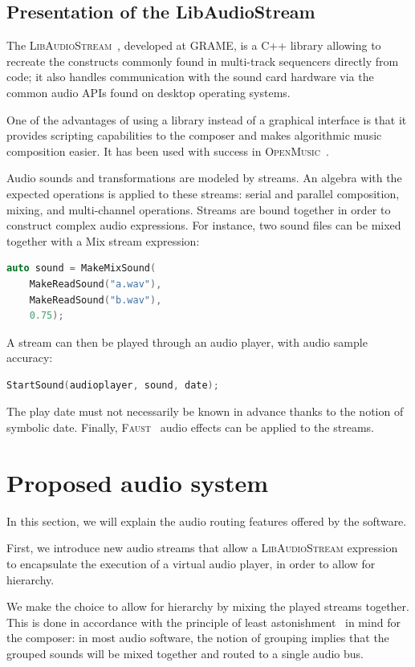 \documentclass{article}
\newcommand*{\LibAudioStream}{\textsc{LibAudioStream}\xspace}
\newcommand*{\openmusic}{\textsc{OpenMusic}\xspace}
\newcommand*{\faust}{\textsc{Faust}\xspace}
\begin{document}
\subsection{Presentation of the LibAudioStream}
The \LibAudioStream~\cite{letzlibaudiostream}, developed at GRAME, is a C++ library allowing to recreate the constructs commonly found in multi-track sequencers directly from code; it also handles communication with the sound card hardware via the common audio APIs found on desktop operating systems.

One of the advantages of using a library instead of a graphical interface is that it provides scripting capabilities to the composer and makes algorithmic music composition easier.
It has been used with success in \openmusic~\cite{bouche2014programmation}.

Audio sounds and transformations are modeled by streams. 
An algebra with the expected operations is applied to these streams: serial and parallel composition, mixing, and multi-channel operations.
Streams are bound together in order to construct complex audio expressions.
For instance, two sound files can be mixed together with a Mix stream expression: 
\begin{lstlisting}[language=C++,columns=fullflexible,basicstyle=\ttfamily]
auto sound = MakeMixSound(
    MakeReadSound("a.wav"), 
    MakeReadSound("b.wav"), 
    0.75);
\end{lstlisting}
A stream can then be played through an audio player, with audio sample accuracy:
 
\begin{lstlisting}[language=C++,columns=fullflexible,basicstyle=\ttfamily]
StartSound(audioplayer, sound, date);
\end{lstlisting}

The play date must not necessarily be known in advance thanks to the notion of symbolic date.
Finally, \faust~\cite{orlarey2009faust} audio effects can be applied to the streams.

\section{Proposed audio system}
In this section, we will explain the audio routing 
features offered by the software.

First, we introduce new audio streams that allow a \LibAudioStream
expression to encapsulate the execution of a virtual audio player, 
in order to allow for hierarchy.

We make the choice to allow for hierarchy by mixing the played streams together.
This is done in accordance with the principle of least astonishment~\cite{seebach2001cranky} in mind for the composer: 
in most audio software, the notion of grouping implies that the grouped sounds will be mixed 
together and routed to a single audio bus.
\end{document}

